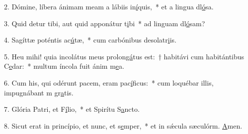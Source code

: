 2. Dómine, líbera ánimam meam a lábiis in\uline{í}quis,~* et a lingua dl\uline{ó}sa.\par 
3. Quid detur tibi, aut quid apponátur t\uline{i}bi~* ad linguam dl\uline{ó}sam?\par 
4. Sagíttæ poténtis ac\uline{ú}tæ,~* cum carbónibus desolatr\uline{i}is.\par 
5. Heu mihi! quia incolátus meus prolon\uline{gá}tus est:~† habitávi cum habitántibus C\uline{e}dar:~* multum íncola fuit ánim m\uline{e}a.\par 
6. Cum his, qui odérunt pacem, eram pac\uline{í}ficus:~* cum loquébar illis, impugnábant m gr\uline{a}tis.\par 
7. Glória Patri, et F\uline{í}lio,~* et Spirítu S\uline{a}ncto.\par 
8. Sicut erat in princípio, et nunc, et s\uline{e}mper,~* et in sǽcula sæculórm. \uline{A}men.\par 
